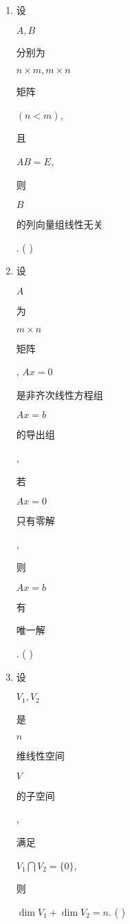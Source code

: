 \documentclass[10pt]{article}
\begin{document}
\begin{enumerate}
  \item \begin{CJK}{UTF8}{mj}设\end{CJK} $A, B$ \begin{CJK}{UTF8}{mj}分别为\end{CJK} $n \times m, m \times n$ \begin{CJK}{UTF8}{mj}矩阵\end{CJK} $(n<m)$, \begin{CJK}{UTF8}{mj}且\end{CJK} $A B=E$, \begin{CJK}{UTF8}{mj}则\end{CJK} $B$ \begin{CJK}{UTF8}{mj}的列向量组线性无关\end{CJK}. ( )

  \item \begin{CJK}{UTF8}{mj}设\end{CJK} $A$ \begin{CJK}{UTF8}{mj}为\end{CJK} $m \times n$ \begin{CJK}{UTF8}{mj}矩阵\end{CJK}, $A x=0$ \begin{CJK}{UTF8}{mj}是非齐次线性方程组\end{CJK} $A x=b$ \begin{CJK}{UTF8}{mj}的导出组\end{CJK}, \begin{CJK}{UTF8}{mj}若\end{CJK} $A x=0$ \begin{CJK}{UTF8}{mj}只有零解\end{CJK}, \begin{CJK}{UTF8}{mj}则\end{CJK} $A x=b$ \begin{CJK}{UTF8}{mj}有\end{CJK} \begin{CJK}{UTF8}{mj}唯一解\end{CJK}. ( )

  \item \begin{CJK}{UTF8}{mj}设\end{CJK} $V_{1}, V_{2}$ \begin{CJK}{UTF8}{mj}是\end{CJK} $n$ \begin{CJK}{UTF8}{mj}维线性空间\end{CJK} $V$ \begin{CJK}{UTF8}{mj}的子空间\end{CJK}, \begin{CJK}{UTF8}{mj}满足\end{CJK} $V_{1} \bigcap V_{2}=\{0\}$, \begin{CJK}{UTF8}{mj}则\end{CJK} $\operatorname{dim} V_{1}+\operatorname{dim} V_{2}=n$. ( )


\end{enumerate}
\end{document}

